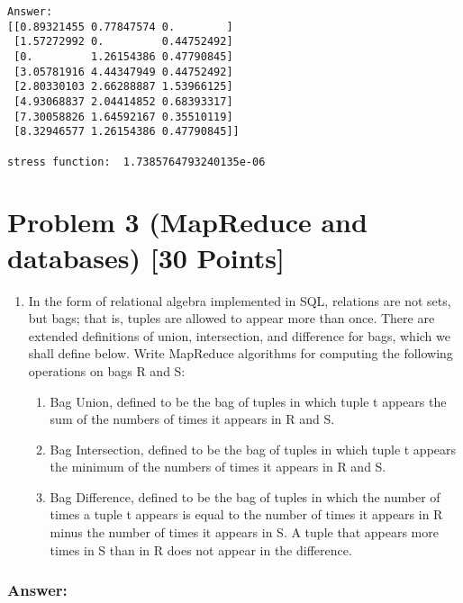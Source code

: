 \documentclass[11pt]{article}
\providecommand{\tightlist}{%
      \setlength{\itemsep}{0pt}\setlength{\parskip}{0pt}}
\begin{document}
    \begin{Verbatim}[commandchars=\\\{\}]
Answer:
[[0.89321455 0.77847574 0.        ]
 [1.57272992 0.         0.44752492]
 [0.         1.26154386 0.47790845]
 [3.05781916 4.44347949 0.44752492]
 [2.80330103 2.66288887 1.53966125]
 [4.93068837 2.04414852 0.68393317]
 [7.30058826 1.64592167 0.35510119]
 [8.32946577 1.26154386 0.47790845]]

stress function:  1.7385764793240135e-06
    \end{Verbatim}

    \hypertarget{problem-3-mapreduce-and-databases-30-points}{%
\section{Problem 3 (MapReduce and databases) {[}30
Points{]}}\label{problem-3-mapreduce-and-databases-30-points}}

\begin{enumerate}
\def\labelenumi{\arabic{enumi}.}
\tightlist
\item
  In the form of relational algebra implemented in SQL, relations are
  not sets, but bags; that is, tuples are allowed to appear more than
  once. There are extended definitions of union, intersection, and
  difference for bags, which we shall define below. Write MapReduce
  algorithms for computing the following operations on bags R and S:

  \begin{enumerate}
  \def\labelenumii{\arabic{enumii}.}
  \tightlist
  \item
    Bag Union, defined to be the bag of tuples in which tuple t appears
    the sum of the numbers of times it appears in R and S.
  \item
    Bag Intersection, defined to be the bag of tuples in which tuple t
    appears the minimum of the numbers of times it appears in R and S.
  \item
    Bag Difference, defined to be the bag of tuples in which the number
    of times a tuple t appears is equal to the number of times it
    appears in R minus the number of times it appears in S. A tuple that
    appears more times in S than in R does not appear in the difference.
  \end{enumerate}
\end{enumerate}

    \hypertarget{answer}{%
\subsubsection{Answer:}\label{answer}}
\end{document}
